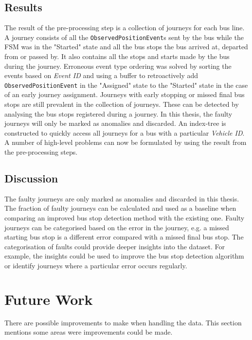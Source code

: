 \subsection{Results}
The result of the pre-processing step is a collection of journeys for each bus line.
A journey consists of all the \texttt{ObservedPositionEvent}s sent by the bus while the FSM was in the "Started" state and all the bus stops the bus arrived at, departed from or passed by.
It also contains all the stops and starts made by the bus during the journey.
Erroneous event type ordering was solved by sorting the events based on \textit{Event ID} and using a buffer to retroactively add \texttt{ObservedPositionEvent} in the "Assigned" state to the "Started" state in the case of an early journey assignment.
Journeys with early stopping or missed final bus stops are still prevalent in the collection of journeys.
These can be detected by analysing the bus stops registered during a journey.
In this thesis, the faulty journeys will only be marked as anomalies and discarded.
An index-tree is constructed to quickly access all journeys for a bus with a particular \textit{Vehicle ID}.
A number of high-level problems can now be formulated by using the result from the pre-processing steps.

\subsection{Discussion}
The faulty journeys are only marked as anomalies and discarded in this thesis.
The fraction of faulty journeys can be calculated and used as a baseline when comparing an improved bus stop detection method with the existing one.
Faulty journeys can be categorised based on the error in the journey, e.g. a missed starting bus stop is a different error compared with a missed final bus stop.
The categorisation of faults could provide deeper insights into the dataset.
For example, the insights could be used to improve the bus stop detection algorithm or identify journeys where a particular error occurs regularly.

\section{Future Work}
There are possible improvements to make when handling the data.
This section mentions some areas were improvements could be made.

